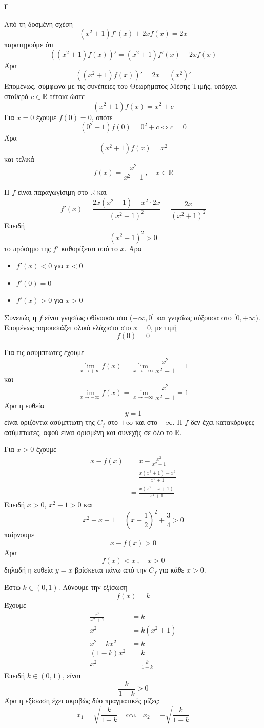 \begin{thema}{Γ}
\begin{erwthma}
\item Από τη δοσμένη σχέση
\[
(x^2+1)f'(x)+2xf(x)=2x
\]
παρατηρούμε ότι
\[
\left((x^2+1)f(x)\right)'=(x^2+1)f'(x)+2xf(x)
\]
Άρα
\[
\left((x^2+1)f(x)\right)'=2x=(x^2)'
\]
Επομένως, σύμφωνα με τις συνέπειες του Θεωρήματος Μέσης Τιμής, υπάρχει σταθερά $c\in\mathbb{R}$ τέτοια ώστε
\[
(x^2+1)f(x)=x^2+c
\]
Για $x=0$ έχουμε $f(0)=0$, οπότε
\[
(0^2+1)f(0)=0^2+c\Leftrightarrow c=0
\]
Άρα
\[
(x^2+1)f(x)=x^2
\]
και τελικά
\[
f(x)=\frac{x^2}{x^2+1}\ ,\quad x\in\mathbb{R}
\]

\item Η $f$ είναι παραγωγίσιμη στο $\mathbb{R}$ και
\[
f'(x)=\frac{2x(x^2+1)-x^2\cdot 2x}{(x^2+1)^2}
=\frac{2x}{(x^2+1)^2}
\]
Επειδή
\[
(x^2+1)^2>0
\]
το πρόσημο της $f'$ καθορίζεται από το $x$.
Άρα
\begin{itemize}
\item $f'(x)<0$ για $x<0$
\item $f'(0)=0$
\item $f'(x)>0$ για $x>0$
\end{itemize}
Συνεπώς η $f$ είναι γνησίως φθίνουσα στο $(-\infty,0]$ και γνησίως αύξουσα στο $[0,+\infty)$.
Επομένως παρουσιάζει ολικό ελάχιστο στο $x=0$, με τιμή
\[
f(0)=0
\]

Για τις ασύμπτωτες έχουμε
\[
\lim\limits_{x\to+\infty}f(x)
=\lim\limits_{x\to+\infty}\frac{x^2}{x^2+1}=1
\]
και
\[
\lim\limits_{x\to-\infty}f(x)
=\lim\limits_{x\to-\infty}\frac{x^2}{x^2+1}=1
\]
Άρα η ευθεία
\[
y=1
\]
είναι οριζόντια ασύμπτωτη της $C_f$ στο $+\infty$ και στο $-\infty$.
Η $f$ δεν έχει κατακόρυφες ασύμπτωτες, αφού είναι ορισμένη και συνεχής σε όλο το $\mathbb{R}$.

\item Για $x>0$ έχουμε
\begin{align*}
x-f(x)
&=x-\frac{x^2}{x^2+1}\\
&=\frac{x(x^2+1)-x^2}{x^2+1}\\
&=\frac{x(x^2-x+1)}{x^2+1}
\end{align*}
Επειδή $x>0$, $x^2+1>0$ και
\[
x^2-x+1=\left(x-\frac{1}{2}\right)^2+\frac{3}{4}>0
\]
παίρνουμε
\[
x-f(x)>0
\]
Άρα
\[
f(x)<x\ ,\quad x>0
\]
δηλαδή η ευθεία $y=x$ βρίσκεται πάνω από την $C_f$ για κάθε $x>0$.

\item Έστω $k\in(0,1)$.
Λύνουμε την εξίσωση
\[
f(x)=k
\]
Έχουμε
\begin{align*}
\frac{x^2}{x^2+1}&=k\\
x^2&=k(x^2+1)\\
x^2-kx^2&=k\\
(1-k)x^2&=k\\
x^2&=\frac{k}{1-k}
\end{align*}
Επειδή $k\in(0,1)$, είναι
\[
\frac{k}{1-k}>0
\]
Άρα η εξίσωση έχει ακριβώς δύο πραγματικές ρίζες:
\[
x_1=\sqrt{\frac{k}{1-k}}
\quad \text{και}\quad
x_2=-\sqrt{\frac{k}{1-k}}
\]
\end{erwthma}
\end{thema}

